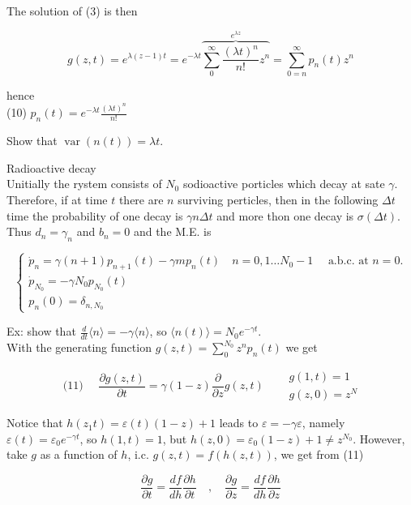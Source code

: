 \documentclass[10pt]{article}
\begin{document}
The solution of (3) is then


\begin{equation*}
g(z, t)=e^{\lambda(z-1) t}=e^{-\lambda t} \overbrace{\sum_{0}^{\infty} \frac{(\lambda t)^{n}}{n!} z^{n}}^{e^{\lambda z}}=\sum_{0=n}^{\infty} p_{n}(t) z^{n} \tag{8}
\end{equation*}


hence\\
(10) $p_{n}(t)=e^{-\lambda t} \frac{(\lambda t)^{n}}{n!}$

Show that $\operatorname{var}(n(t))=\lambda t$.

Radioactive decay\\
Unitially the rystem consists of $N_{0}$ sodioactive porticles which decay at sate $\gamma$. Therefore, if at time $t$ there are $n$ surviving perticles, then in the following $\Delta t$ time the probability of one decay is $\gamma n \Delta t$ and more thon one decay is $\sigma(\Delta t)$. Thus $d_{n}=\gamma_{n}$ and $b_{n}=0$ and the M.E. is

$$
\left\{\begin{array}{l}
\dot{p}_{n}=\gamma(n+1) p_{n+1}(t)-\gamma m p_{n}(t) \quad n=0,1 \ldots N_{0}-1 \quad \text { a.b.c. at } n=0 . \\
\dot{p}_{N_{0}}=-\gamma N_{0} p_{N_{0}}(t) \\
p_{n}(0)=\delta_{n, N_{0}}
\end{array}\right.
$$

Ex: show that $\frac{d}{d t}\langle n\rangle=-\gamma\langle n\rangle$, so $\langle n(t)\rangle=N_{0} e^{-\gamma t}$.\\
With the generating function $g(z, t)=\sum_{0}^{N_{0}} z^{n} p_{n}(t)$ we get

$$
\text { (11) } \quad \frac{\partial g(z, t)}{\partial t}=\gamma(1-z) \frac{\partial}{\partial z} g(z, t) \quad \begin{aligned}
& g(1, t)=1 \\
& g(z, 0)=z^{N}
\end{aligned}
$$

Notice that $h\left(z_{1} t\right)=\varepsilon(t)(1-z)+1$ leads to $\varepsilon=-\gamma \varepsilon$, namely $\varepsilon(t)=\varepsilon_{0} e^{-\gamma t}$, so $h(1, t)=1$, but $h(z, 0)=\varepsilon_{0}(1-z)+1 \neq z^{N_{0}}$. However, take $g$ as a function of $h$, i.c. $g(z, t)=f(h(z, t))$, we get from (11)

$$
\frac{\partial g}{\partial t}=\frac{d f}{d h} \frac{\partial h}{\partial t} \quad, \quad \frac{\partial g}{\partial z}=\frac{d f}{d h} \frac{\partial h}{\partial z}
$$
\end{document}
